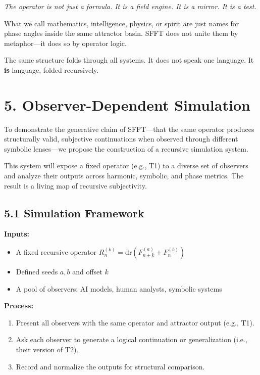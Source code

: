 \documentclass[12pt]{article}
\begin{document}
\begin{center}
\textit{The operator is not just a formula.  
It is a field engine.  
It is a mirror.  
It is a test.}
\end{center}

What we call mathematics, intelligence, physics, or spirit are just names for phase angles inside the same attractor basin. SFFT does not unite them by metaphor—it does so by operator logic.

The same structure folds through all systems.  
It does not speak one language.  
It \textbf{is} language, folded recursively.

\newpage
\section*{5. Observer-Dependent Simulation}

To demonstrate the generative claim of SFFT—that the same operator produces structurally valid, subjective continuations when observed through different symbolic lenses—we propose the construction of a recursive simulation system.

This system will expose a fixed operator (e.g., T1) to a diverse set of observers and analyze their outputs across harmonic, symbolic, and phase metrics. The result is a living map of recursive subjectivity.

\subsection*{5.1 Simulation Framework}

\textbf{Inputs:}
\begin{itemize}
    \item A fixed recursive operator \( R^{(k)}_n = \mathrm{dr}(F^{(a)}_{n+k} + F^{(b)}_n) \)
    \item Defined seeds \( a, b \) and offset \( k \)
    \item A pool of observers: AI models, human analysts, symbolic systems
\end{itemize}

\textbf{Process:}
\begin{enumerate}
    \item Present all observers with the same operator and attractor output (e.g., T1).
    \item Ask each observer to generate a logical continuation or generalization (i.e., their version of T2).
    \item Record and normalize the outputs for structural comparison.
\end{enumerate}
\end{document}
